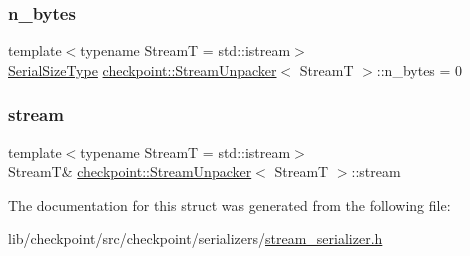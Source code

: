 \subsubsection{\texorpdfstring{n\+\_\+bytes}{n\_bytes}}
{\footnotesize\ttfamily template$<$typename StreamT  = std\+::istream$>$ \\
\hyperlink{namespacecheckpoint_a083f6674da3f94c2901b18c6d238217c}{Serial\+Size\+Type} \hyperlink{structcheckpoint_1_1_stream_unpacker}{checkpoint\+::\+Stream\+Unpacker}$<$ StreamT $>$\+::n\+\_\+bytes = 0\hspace{0.3cm}{\ttfamily [private]}}

\mbox{\label{structcheckpoint_1_1_stream_unpacker_aec9a1b42018ad4872ebd8917de9e019f}} 
\subsubsection{\texorpdfstring{stream}{stream}}
{\footnotesize\ttfamily template$<$typename StreamT  = std\+::istream$>$ \\
StreamT\& \hyperlink{structcheckpoint_1_1_stream_unpacker}{checkpoint\+::\+Stream\+Unpacker}$<$ StreamT $>$\+::stream\hspace{0.3cm}{\ttfamily [private]}}



The documentation for this struct was generated from the following file\+:\begin{DoxyCompactItemize}
\item 
lib/checkpoint/src/checkpoint/serializers/\hyperlink{stream__serializer_8h}{stream\+\_\+serializer.\+h}\end{DoxyCompactItemize}
